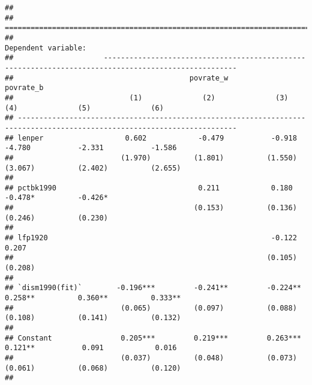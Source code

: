 \documentclass[
]{article}
\begin{document}
\begin{verbatim}
## 
## =========================================================================================================================
##                                                              Dependent variable:                                         
##                     -----------------------------------------------------------------------------------------------------
##                                         povrate_w                                          povrate_b                     
##                           (1)              (2)              (3)              (4)              (5)              (6)       
## -------------------------------------------------------------------------------------------------------------------------
## lenper                   0.602            -0.479           -0.918           -4.780           -2.331           -1.586     
##                         (1.970)          (1.801)          (1.550)          (3.067)          (2.402)          (2.655)     
##                                                                                                                          
## pctbk1990                                 0.211            0.180                            -0.478*          -0.426*     
##                                          (0.153)          (0.136)                           (0.246)          (0.230)     
##                                                                                                                          
## lfp1920                                                    -0.122                                             0.207      
##                                                           (0.105)                                            (0.208)     
##                                                                                                                          
## `dism1990(fit)`        -0.196***         -0.241**         -0.224**         0.258**          0.360**          0.333**     
##                         (0.065)          (0.097)          (0.088)          (0.108)          (0.141)          (0.132)     
##                                                                                                                          
## Constant                0.205***         0.219***         0.263***         0.121**           0.091            0.016      
##                         (0.037)          (0.048)          (0.073)          (0.061)          (0.068)          (0.120)     
##                                                                                                                          

\end{verbatim}
\end{document}
